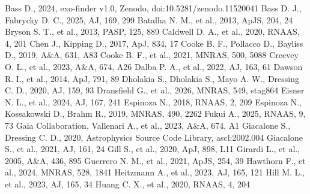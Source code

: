 \documentclass[fleqn,usenatbib]{mnras}
\begin{document}
\begin{thebibliography}{}

 Bass D., 2024, exo-finder v1.0, Zenodo, doi:10.5281/zenodo.11520041
 Bass D. J., Fabrycky D. C., 2025, AJ, 169, 299
 Batalha N. M., et al., 2013, ApJS, 204, 24
 Bryson S. T., et al., 2013, PASP, 125, 889
 Caldwell D. A., et al., 2020, RNAAS, 4, 201
 Chen J., Kipping D., 2017, ApJ, 834, 17
 Cooke B. F., Pollacco D., Bayliss D., 2019, A\&A, 631, A83
 Cooke B. F., et al., 2021, MNRAS, 500, 5088
 Creevey O. L., et al., 2023, A\&A, 674, A26
 Dalba P. A., et al., 2022, AJ, 163, 61
 Dawson R. I., et al., 2014, ApJ, 791, 89
 Dholakia S., Dholakia S., Mayo A. W., Dressing C. D., 2020, AJ, 159, 93
 Dransfield G., et al., 2026, MNRAS, 549, stag864
 Eisner N. L., et al., 2024, AJ, 167, 241
 Espinoza N., 2018, RNAAS, 2, 209
 Espinoza N., Kossakowski D., Brahm R., 2019, MNRAS, 490, 2262
 Fukui A., 2025, RNAAS, 9, 73
 Gaia Collaboration, Vallenari A., et al., 2023, A\&A, 674, A1
 Giacalone S., Dressing C. D., 2020, Astrophysics Source Code Library, ascl:2002.004
 Giacalone S., et al., 2021, AJ, 161, 24
 Gill S., et al., 2020, ApJ, 898, L11
 Girardi L., et al., 2005, A\&A, 436, 895
 Guerrero N. M., et al., 2021, ApJS, 254, 39
 Hawthorn F., et al., 2024, MNRAS, 528, 1841
 Heitzmann A., et al., 2023, AJ, 165, 121
 Hill M. L., et al., 2023, AJ, 165, 34
 Huang C. X., et al., 2020, RNAAS, 4, 204

\end{thebibliography}
\end{document}
